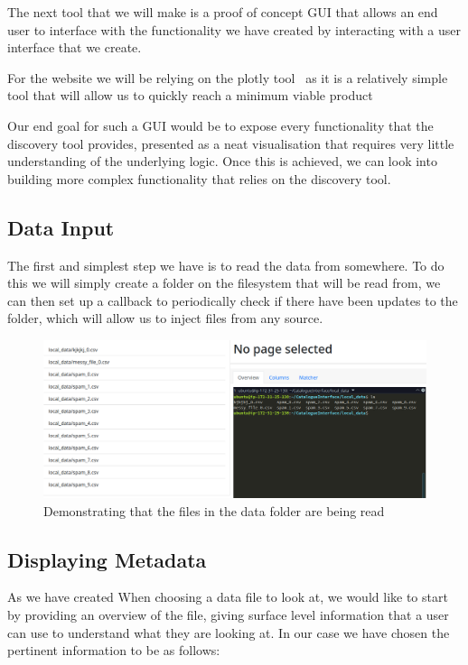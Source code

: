 The next tool that we will make is a proof of concept GUI that allows an end user to interface with the functionality
we have created by interacting with a user interface that we create.

For the website we will be relying on the plotly tool~\cite{plotlydash} as it is a relatively simple tool that will
allow us to quickly reach a minimum viable product

Our end goal for such a GUI would be to expose every functionality that the discovery tool provides, presented as a neat
visualisation that requires very little understanding of the underlying logic.
Once this is achieved, we can look into building more complex functionality that relies on the discovery tool.

\subsection{Data Input}\label{subsec:data-input}
The first and simplest step we have is to read the data from somewhere.
To do this we will simply create a folder on the filesystem that will be read from, we can then set up a callback
to periodically check if there have been updates to the folder, which will allow us to inject files from any source.

\begin{figure}[H]
    \centering
    \includegraphics[width=12cm]{figures/website_images/website_data_catalogue}
    \caption{Demonstrating that the files in the data folder are being read}\label{fig:catalogue_file_list}
\end{figure}

\subsection{Displaying Metadata}\label{subsec:displaying-metadata}
As we have created
When choosing a data file to look at, we would like to start by providing an overview of the file, giving surface level
information that a user can use to understand what they are looking at.
In our case we have chosen the pertinent information to be as follows:

